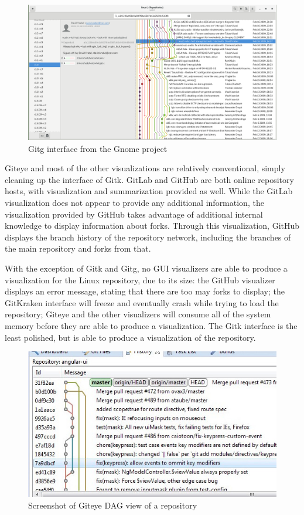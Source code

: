 \begin{figure}[htpb]
  \centering
  \includegraphics[width=0.8\linewidth]{Figures/introduction/gitg.png}
  \caption{Gitg interface from the Gnome project}
  \label{fig:gitg_screenshot}
\end{figure}

Giteye and most of the other visualizations are relatively
conventional, simply cleaning up the interface of Gitk.
GitLab and GitHub are both online repository hosts, with
visualization and summarization provided as well. While the GitLab
visualization does not appear to provide any additional information, the
visualization provided by GitHub takes advantage of additional internal
knowledge to display information about forks. Through this
visualization, GitHub displays the branch history of the repository
network, including the branches of the main repository and forks from
that.

With the exception of Gitk and Gitg, no GUI visualizers
are able to produce a visualization for the Linux repository, due to its
size: the GitHub visualizer displays an error message, stating that
there are too may forks to display; the GitKraken interface will freeze
and eventually crash while trying to load the repository; Giteye
and the other visualizers will consume all of the system memory before
they are able to produce a visualization. The Gitk interface is the
least polished, but is able to produce a visualization of the
repository.

\begin{figure}[htpb]
  \centering
  \includegraphics[width=0.8\linewidth]{Figures/introduction/giteye_graph.jpg}
  \caption{Screenshot of Giteye DAG view of a repository}
  \label{fig:giteye_screenshot}
\end{figure}

